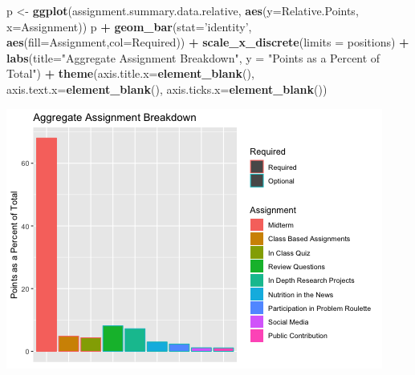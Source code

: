 \documentclass[]{article}
\newenvironment{Shaded}{\begin{snugshade}}{\end{snugshade}}
\newcommand{\KeywordTok}[1]{\textcolor[rgb]{0.13,0.29,0.53}{\textbf{#1}}}
\newcommand{\DataTypeTok}[1]{\textcolor[rgb]{0.13,0.29,0.53}{#1}}
\newcommand{\StringTok}[1]{\textcolor[rgb]{0.31,0.60,0.02}{#1}}
\newcommand{\OperatorTok}[1]{\textcolor[rgb]{0.81,0.36,0.00}{\textbf{#1}}}
\newcommand{\NormalTok}[1]{#1}
\begin{document}
\begin{Shaded}
\begin{Highlighting}[]
\NormalTok{p <-}\StringTok{ }\KeywordTok{ggplot}\NormalTok{(assignment.summary.data.relative, }\KeywordTok{aes}\NormalTok{(}\DataTypeTok{y=}\NormalTok{Relative.Points, }\DataTypeTok{x=}\NormalTok{Assignment))}
\NormalTok{p }\OperatorTok{+}\StringTok{ }\KeywordTok{geom_bar}\NormalTok{(}\DataTypeTok{stat=}\StringTok{'identity'}\NormalTok{, }\KeywordTok{aes}\NormalTok{(}\DataTypeTok{fill=}\NormalTok{Assignment,}\DataTypeTok{col=}\NormalTok{Required)) }\OperatorTok{+}\StringTok{ }\KeywordTok{scale_x_discrete}\NormalTok{(}\DataTypeTok{limits =}\NormalTok{ positions) }\OperatorTok{+}\StringTok{   }
\StringTok{  }\KeywordTok{labs}\NormalTok{(}\DataTypeTok{title=}\StringTok{"Aggregate Assignment Breakdown"}\NormalTok{,  }\DataTypeTok{y =} \StringTok{"Points as a Percent of Total"}\NormalTok{) }\OperatorTok{+}
\StringTok{  }\KeywordTok{theme}\NormalTok{(}\DataTypeTok{axis.title.x=}\KeywordTok{element_blank}\NormalTok{(),}
        \DataTypeTok{axis.text.x=}\KeywordTok{element_blank}\NormalTok{(),}
        \DataTypeTok{axis.ticks.x=}\KeywordTok{element_blank}\NormalTok{())}
\end{Highlighting}
\end{Shaded}

\includegraphics{figures/points-from-assessments-summary-3.png}
\end{document}
